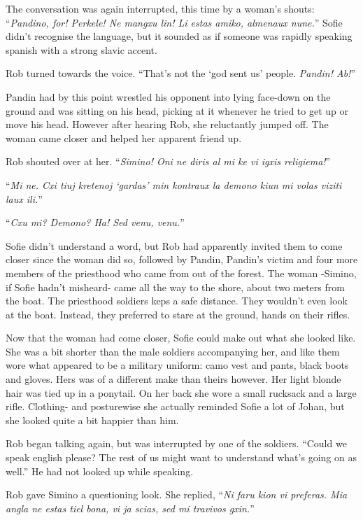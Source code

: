 \documentclass[letterpaper,12pt]{report}
\begin{document}
The conversation was again interrupted, this time by a woman's shouts: ``\textit{Pandino, for! Perkele! Ne mangxu lin! Li estas amiko, almenaux nune.}'' Sofie didn't recognise the language, but it sounded as if someone was rapidly speaking spanish with a strong slavic accent.

Rob turned towards the voice. ``That's not the `god sent us' people. \textit{Pandin! Ab!}''

Pandin had by this point wrestled his opponent into lying face-down on the ground and was sitting on his head, picking at it whenever he tried to get up or move his head. However after hearing Rob, she reluctantly jumped off. The woman came closer and helped her apparent friend up.

Rob shouted over at her. ``\textit{Simino! Oni ne diris al mi ke vi igxis religiema!}''

``\textit{Mi ne. Cxi tiuj kretenoj `gardas' min kontraux la demono kiun mi volas viziti laux ili.}''

``\textit{Cxu mi? Demono? Ha! Sed venu, venu.}''

Sofie didn't understand a word, but Rob had apparently invited them to come closer since the woman did so, followed by Pandin, Pandin's victim and four more members of the priesthood who came from out of the forest. The woman -Simino, if Sofie hadn't misheard- came all the way to the shore, about two meters from the boat. The priesthood soldiers keps a safe distance. They wouldn't even look at the boat. Instead, they preferred to stare at the ground, hands on their rifles.

Now that the woman had come closer, Sofie could make out what she looked like. She was a bit shorter than the male soldiers accompanying her, and like them wore what appeared to be a military uniform: camo vest and pants, black boots and gloves. Hers was of a different make than theirs however. Her light blonde hair was tied up in a ponytail. On her back she wore a small rucksack and a large rifle. Clothing- and posturewise she actually reminded Sofie a lot of Johan, but she looked quite a bit happier than him.

Rob began talking again, but was interrupted by one of the soldiers. ``Could we speak english please? The rest of us might want to understand what's going on as well.'' He had not looked up while speaking.

Rob gave Simino a questioning look. She replied, ``\textit{Ni faru kion vi preferas. Mia angla ne estas tiel bona, vi ja scias, sed mi travivos gxin.}''
\end{document}
